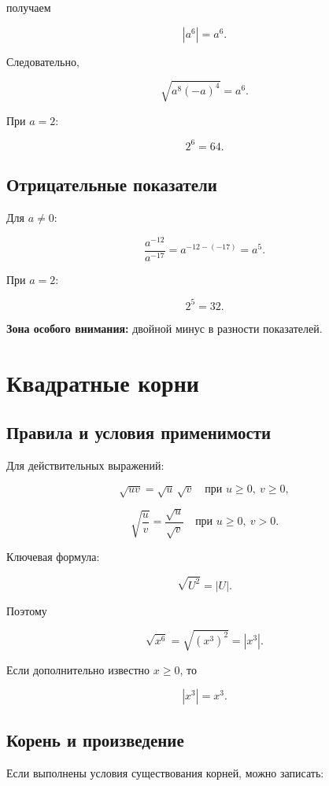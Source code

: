 \documentclass[a4paper,12pt]{article}
\begin{document}
получаем

\[
|a^6|=a^6.
\]

Следовательно,

\[
\sqrt{a^8(-a)^4}=a^6.
\]

При $a=2$:

\[
2^6=64.
\]

\subsection{Отрицательные показатели}

Для $a\ne0$:

\[
\frac{a^{-12}}{a^{-17}}
=
a^{-12-(-17)}
=
a^5.
\]

При $a=2$:

\[
2^5=32.
\]

\textbf{Зона особого внимания:}
двойной минус в разности показателей.


\section{Квадратные корни}

\subsection{Правила и условия применимости}

Для действительных выражений:

\[
\sqrt{uv}
=
\sqrt{u}\,\sqrt{v}
\quad
\text{при }u\ge0,\ v\ge0,
\]

\[
\sqrt{\frac{u}{v}}
=
\frac{\sqrt{u}}{\sqrt{v}}
\quad
\text{при }u\ge0,\ v>0.
\]

Ключевая формула:

\[
\boxed{\sqrt{U^2}=|U|}.
\]

Поэтому

\[
\sqrt{x^6}
=
\sqrt{(x^3)^2}
=
|x^3|.
\]

Если дополнительно известно $x\ge0$, то

\[
|x^3|=x^3.
\]

\subsection{Корень и произведение}

Если выполнены условия существования корней, можно записать:
\end{document}
